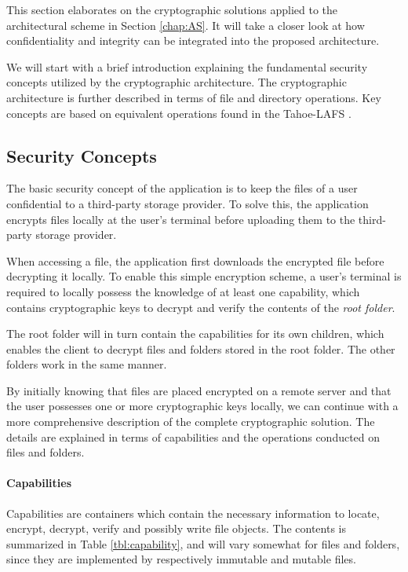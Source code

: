\documentclass[pdftex,english,10pt,b5paper,twoside]{book}
\begin{document}
This section elaborates on the cryptographic solutions applied to the
architectural scheme in Section \ref{chap:AS}. It will take a closer look at
how confidentiality and integrity can be integrated into the proposed
architecture.

We will start with a brief introduction explaining the fundamental security
concepts utilized by the cryptographic architecture. The cryptographic
architecture is further described in terms of file and directory operations.
Key concepts are based on equivalent operations found in the Tahoe-\ac{LAFS}
\cite{tahoe}.

\subsection{Security Concepts}

The basic security concept of the application is to keep the files of a user
confidential to a third-party storage provider. To solve this, the application
encrypts files locally at the user's terminal before uploading them to the
third-party storage provider.

When accessing a file, the application first downloads the encrypted file
before decrypting it locally. To enable this simple encryption scheme, a user's
terminal is required to locally possess the knowledge of at least one
capability, which contains cryptographic keys to decrypt and verify the
contents of the \emph{root folder}.

The root folder will in turn contain the capabilities for its own children,
which enables the client to decrypt files and folders stored in the root
folder. The other folders work in the same manner.

By initially knowing that files are placed encrypted on a remote server and
that the user possesses one or more cryptographic keys locally, we can continue
with a more comprehensive description of the complete cryptographic solution.
The details are explained in terms of capabilities and the operations conducted
on files and folders.

\paragraph{Capabilities} Capabilities are containers which contain the
necessary information to locate, encrypt, decrypt, verify and possibly write
file objects. The contents is summarized in Table \ref{tbl:capability}, and
will vary somewhat for files and folders, since they are implemented by
respectively immutable and mutable files.
\end{document}
